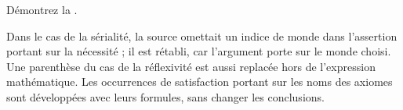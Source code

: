 \documentclass[../../../include/open-logic-section]{subfiles}
\begin{document}
\begin{prob}
  Démontrez la .
\end{prob}
\begin{editorial}Dans le cas de la sérialité, la source omettait un indice de monde dans l’assertion portant sur la nécessité ; il est rétabli, car l’argument porte sur le monde choisi. Une parenthèse du cas de la réflexivité est aussi replacée hors de l’expression mathématique. Les occurrences de satisfaction portant sur les noms des axiomes sont développées avec leurs formules, sans changer les conclusions.\end{editorial}
\end{document}
